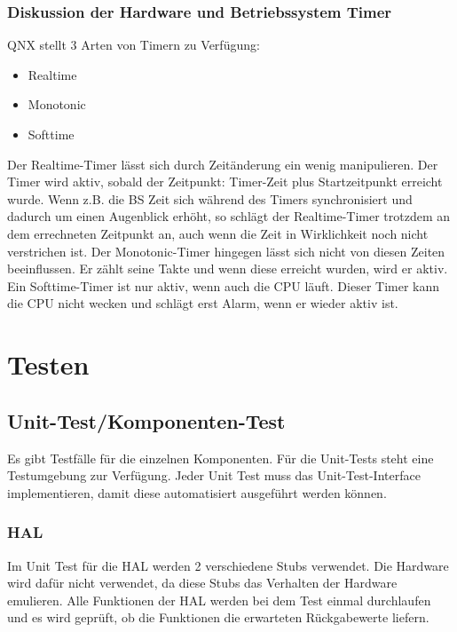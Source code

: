 \documentclass[oneside,a4paper,titlepage]{scrartcl} %
\begin{document}
 \subsubsection{Diskussion der Hardware und Betriebssystem Timer}
   QNX stellt 3 Arten von Timern zu Verfügung:
   \begin{itemize}
    \item Realtime
    \item Monotonic
    \item Softtime
   \end{itemize}
   Der Realtime-Timer lässt sich durch Zeitänderung ein wenig manipulieren. Der Timer wird aktiv, sobald der Zeitpunkt: Timer-Zeit plus Startzeitpunkt erreicht wurde.
   Wenn z.B. die BS Zeit sich während des Timers synchronisiert und dadurch um einen Augenblick erhöht, so schlägt der Realtime-Timer trotzdem an dem errechneten Zeitpunkt an, auch wenn die Zeit in Wirklichkeit noch nicht verstrichen ist.\newline
   Der Monotonic-Timer hingegen lässt sich nicht von diesen Zeiten beeinflussen. Er zählt seine Takte und wenn diese erreicht wurden, wird er aktiv.\newline
   Ein Softtime-Timer ist nur aktiv, wenn auch die CPU läuft. Dieser Timer kann die CPU nicht wecken und schlägt erst Alarm, wenn er wieder aktiv ist.\newline

\section{Testen}

\subsection{Unit-Test/Komponenten-Test}
Es gibt Testfälle für die einzelnen Komponenten. Für die Unit-Tests steht eine Testumgebung zur Verfügung.
Jeder Unit Test muss das Unit-Test-Interface implementieren, damit diese automatisiert ausgeführt werden
können.

\subsubsection{HAL}
Im Unit Test für die HAL werden 2 verschiedene Stubs verwendet. Die Hardware wird dafür nicht verwendet,
da diese Stubs das Verhalten der Hardware emulieren. Alle Funktionen der HAL werden bei dem Test einmal durchlaufen
und es wird geprüft, ob die Funktionen die erwarteten Rückgabewerte liefern.
\end{document}
